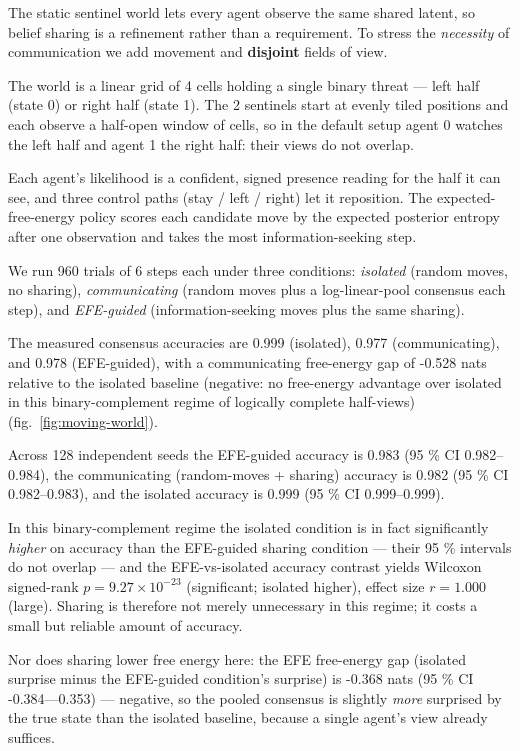 \documentclass[
  english,
]{article}
\theoremstyle{plain}
\theoremstyle{definition}
\theoremstyle{remark}
\theoremstyle{definition}
\begin{document}
The static sentinel world lets every agent observe the same shared
latent, so belief sharing is a refinement rather than a requirement. To
stress the \emph{necessity} of communication we add movement and
\textbf{disjoint} fields of view.

The world is a linear grid of 4 cells holding a single binary threat ---
left half (state 0) or right half (state 1). The 2 sentinels start at
evenly tiled positions and each observe a half-open window of cells, so
in the default setup agent 0 watches the left half and agent 1 the right
half: their views do not overlap.

Each agent's likelihood is a confident, signed presence reading for the
half it can see, and three control paths (stay / left / right) let it
reposition. The expected-free-energy policy scores each candidate move
by the expected posterior entropy after one observation and takes the
most information-seeking step.

We run 960 trials of 6 steps each under three conditions:
\emph{isolated} (random moves, no sharing), \emph{communicating} (random
moves plus a log-linear-pool consensus each step), and \emph{EFE-guided}
(information-seeking moves plus the same sharing).

The measured consensus accuracies are 0.999 (isolated), 0.977
(communicating), and 0.978 (EFE-guided), with a communicating
free-energy gap of -0.528 nats relative to the isolated baseline
(negative: no free-energy advantage over isolated in this
binary-complement regime of logically complete half-views)
(fig.~\ref{fig:moving-world}).

Across 128 independent seeds the EFE-guided accuracy is 0.983 (95 \% CI
0.982--0.984), the communicating (random-moves + sharing) accuracy is
0.982 (95 \% CI 0.982--0.983), and the isolated accuracy is 0.999 (95 \%
CI 0.999--0.999).

In this binary-complement regime the isolated condition is in fact
significantly \emph{higher} on accuracy than the EFE-guided sharing
condition --- their 95 \% intervals do not overlap --- and the
EFE-vs-isolated accuracy contrast yields Wilcoxon signed-rank
\(p = 9.27 \times 10^{-23}\) (significant; isolated higher), effect size
\(r = 1.000\) (large). Sharing is therefore not merely unnecessary in
this regime; it costs a small but reliable amount of accuracy.

Nor does sharing lower free energy here: the EFE free-energy gap
(isolated surprise minus the EFE-guided condition's surprise) is -0.368
nats (95 \% CI -0.384---0.353) --- negative, so the pooled consensus is
slightly \emph{more} surprised by the true state than the isolated
baseline, because a single agent's view already suffices.
\end{document}
